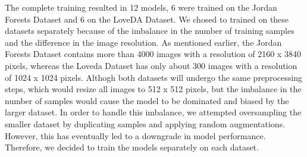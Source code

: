 The complete training resulted in 12 models, 6 were trained on the Jordan Forests Dataset and 6 on the LoveDA Dataset. We chosed to trained on these datasets separately because of the imbalance in the number of training samples and the difference in the image resolution. As mentioned earlier, the Jordan Forests Dataset contains more than 4000 images with a resolution of 2160 x 3840 pixels, whereas the Loveda Dataset has only about 300 images with a resolution of 1024 x 1024 pixels. Althogh both datasets will undergo the same preprocessing steps, which would resize all images to 512 x 512 pixels, but the imbalance in the number of samples would cause the model to be dominated and biased by the larger dataset. In order to handle this imbalance, we attempted oversampling the smaller dataset by duplicating samples and applying random augmentations. However, this has eventually led to a downgrade in model performance. Therefore, we decided to train the models separately on each dataset.\\

